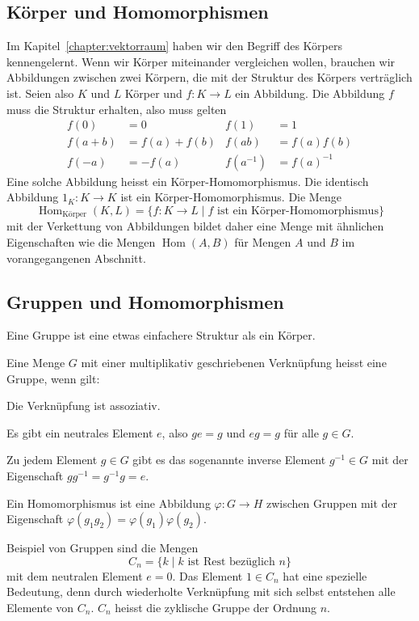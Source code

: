 \subsection{Körper und Homomorphismen}
Im Kapitel~\ref{chapter:vektorraum} haben wir den Begriff des Körpers
kennengelernt.
Wenn wir Körper miteinander vergleichen wollen, brauchen wir Abbildungen
zwischen zwei Körpern, die mit der Struktur des Körpers verträglich ist.
Seien also $K$ und $L$ Körper und $f\colon K\to L$ ein Abbildung.
Die Abbildung $f$ muss die Struktur erhalten, also muss gelten
\[
\begin{aligned}
f(0)&=0&f(1)&=1\\
f(a+b)&=f(a)+f(b)&f(ab)&=f(a)f(b)\\
f(-a)&=-f(a)&f(a^{-1})&=f(a)^{-1}
\end{aligned}
\]
Eine solche Abbildung heisst ein Körper-Homomorphismus.
Die identisch Abbildung $1_K\colon K\to K$ ist ein Körper-Homomorphismus.
Die Menge
\[
\operatorname{Hom}_{\text{Körper}}(K,L)
=
\{f\colon K\to L\;|\;\text{$f$ ist ein Körper-Homomorphismus}\}
\]
mit der Verkettung von Abbildungen
bildet daher eine Menge mit ähnlichen Eigenschaften wie die
Mengen $\operatorname{Hom}(A,B)$ für Mengen $A$ und $B$ im
vorangegangenen Abschnitt.

\subsection{Gruppen und Homomorphismen}
Eine Gruppe ist eine etwas einfachere Struktur als ein Körper.

\begin{definition}
Eine Menge $G$ mit einer multiplikativ geschriebenen Verknüpfung heisst
eine Gruppe, wenn gilt:
\begin{compactenum}
\item Die Verknüpfung ist assoziativ.
\item Es gibt ein neutrales Element $e$, also $ge=g$ und $eg=g$ für alle 
$g\in G$.
\item Zu jedem Element $g\in G$ gibt es das sogenannte inverse
Element $g^{-1}\in G$ mit der Eigenschaft $gg^{-1}=g^{-1}g=e$.
\end{compactenum}
Ein Homomorphismus ist eine Abbildung $\varphi\colon G\to H$ zwischen
Gruppen mit der Eigenschaft
$\varphi(g_1g_2)=\varphi(g_1)\varphi(g_2).$
\end{definition}

Beispiel von Gruppen sind die Mengen 
\[
C_n = \{ k\;|\; \text{$k$ ist Rest bezüglich $n$}\}
\]
mit dem neutralen Element $e=0$.
Das Element $1\in C_n$ hat eine spezielle Bedeutung, denn durch
wiederholte Verknüpfung mit sich selbst entstehen alle Elemente von $C_n$.
$C_n$ heisst die zyklische Gruppe der Ordnung $n$.

